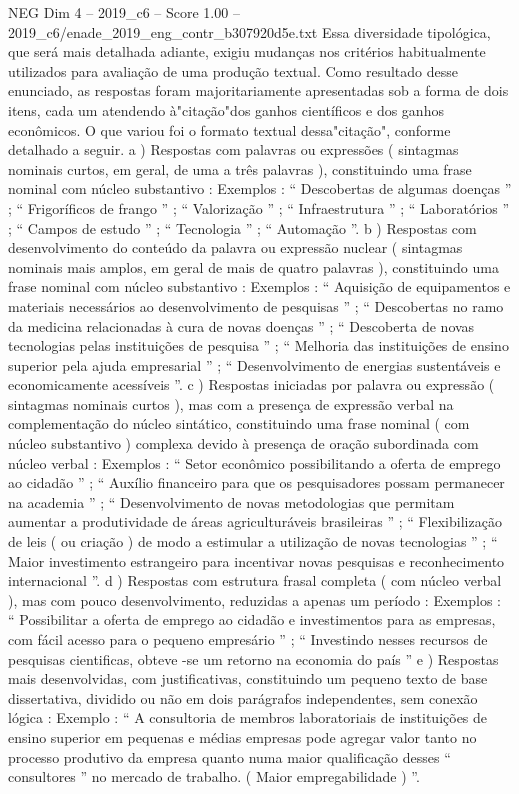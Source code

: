 \begin{textsample}{NEG Dim 4 – 2019\_c6 – Score 1.00 – 2019\_c6/enade\_2019\_eng\_contr\_b307920d5e.txt}
Essa diversidade tipológica, que será mais detalhada adiante, exigiu mudanças nos critérios habitualmente utilizados para avaliação de uma produção textual.
Como resultado desse enunciado, as respostas foram majoritariamente apresentadas sob a forma de dois itens, cada um atendendo à"citação"dos ganhos científicos e dos ganhos econômicos.
O que variou foi o formato textual dessa"citação", conforme detalhado a seguir. a ) Respostas com palavras ou expressões ( sintagmas nominais curtos, em geral, de uma a três palavras ), constituindo uma frase nominal com núcleo substantivo : Exemplos : “ Descobertas de algumas doenças ” ; “ Frigoríficos de frango ” ; “ Valorização ” ; “ Infraestrutura ” ; “ Laboratórios ” ; “ Campos de estudo ” ; “ Tecnologia ” ; “ Automação ”. b ) Respostas com desenvolvimento do conteúdo da palavra ou expressão nuclear ( sintagmas nominais mais amplos, em geral de mais de quatro palavras ), constituindo uma frase nominal com núcleo substantivo : Exemplos : “ Aquisição de equipamentos e materiais necessários ao desenvolvimento de pesquisas ” ; “ Descobertas no ramo da medicina relacionadas à cura de novas doenças ” ; “ Descoberta de novas tecnologias pelas instituições de pesquisa ” ; “ Melhoria das instituições de ensino superior pela ajuda empresarial ” ; “ Desenvolvimento de energias sustentáveis e economicamente acessíveis ”. c ) Respostas iniciadas por palavra ou expressão ( sintagmas nominais curtos ), mas com a presença de expressão verbal na complementação do núcleo sintático, constituindo uma frase nominal ( com núcleo substantivo ) complexa devido à presença de oração subordinada com núcleo verbal : Exemplos : “ Setor econômico possibilitando a oferta de emprego ao cidadão ” ; “ Auxílio financeiro para que os pesquisadores possam permanecer na academia ” ; “ Desenvolvimento de novas metodologias que permitam aumentar a produtividade de áreas agriculturáveis brasileiras ” ; “ Flexibilização de leis ( ou criação ) de modo a estimular a utilização de novas tecnologias ” ; “ Maior investimento estrangeiro para incentivar novas pesquisas e reconhecimento internacional ”. d ) Respostas com estrutura frasal completa ( com núcleo verbal ), mas com pouco desenvolvimento, reduzidas a apenas um período : Exemplos : “ Possibilitar a oferta de emprego ao cidadão e investimentos para as empresas, com fácil acesso para o pequeno empresário ” ; “ Investindo nesses recursos de pesquisas cientificas, obteve -se um retorno na economia do país ” e ) Respostas mais desenvolvidas, com justificativas, constituindo um pequeno texto de base dissertativa, dividido ou não em dois parágrafos independentes, sem conexão lógica : Exemplo : “ A consultoria de membros laboratoriais de instituições de ensino superior em pequenas e médias empresas pode agregar valor tanto no processo produtivo da empresa quanto numa maior qualificação desses “ consultores ” no mercado de trabalho. ( Maior empregabilidade ) ”.

\end{textsample}
